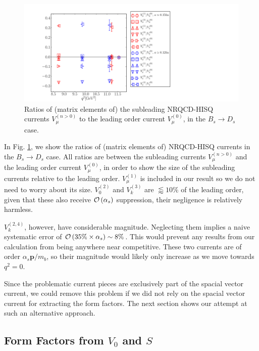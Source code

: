 \begin{figure}[htb!]
  \begin{center}
    \includegraphics[width=1.2\textwidth]{images/nrqcd/BsDs_currentratios.pdf}
  \end{center}
  \caption{Ratios of (matrix elements of) the subleading NRQCD-HISQ currents $V_{\mu}^{(n>0)}$ to the leading order current $V_{\mu}^{(0)}$, in the $B_s\to D_s$ case. \label{eq:currentratios}}
\end{figure}

In Fig. \ref{eq:currentratios}, we show the ratios of (matrix elements of) NRQCD-HISQ currents in the $B_s\to D_s$ case. All ratios are between the subleading currents $V_{\mu}^{(n>0)}$ and the leading order current $V_{\mu}^{(0)}$, in order to show the size of the subleading currents relative to the leading order. $V^{(1)}_{\mu}$ is included in our result so we do not need to worry about its size. $V_0^{(2)}$ and $V_k^{(3)}$ are $\lessapprox 10\%$ of the leading order, given that these also receive $\mathcal{O}\left( \alpha_s \right)$ suppression, their negligence is relatively harmless.

$V_k^{(2,4)}$, however, have considerable magnitude. Neglecting them implies a naive systematic error of $\mathcal{O}\left(  35\% \times \alpha_s  \right) \sim 8\%$. This would prevent any results from our calculation from being anywhere near competitive. These two currents are of order $\alpha_s{\textbf{p}}/m_b$, so their magnitude would likely only increase as we move towards $q^2=0$.

Since the problematic current pieces are exclusively part of the spacial vector current, we could remove this problem if we did not rely on the spacial vector current for extracting the form factors. The next section shows our attempt at such an alternative approach.

\subsection{Form Factors from $V_0$ and $S$}
\label{sec:fplus_divergence}

